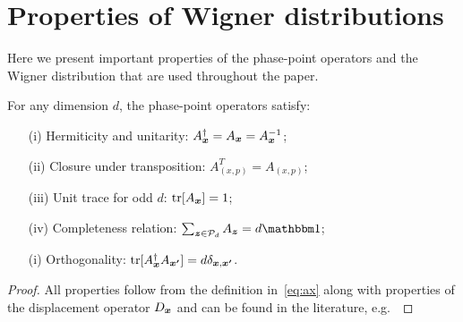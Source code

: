 \section{Properties of Wigner distributions}
\label{app:wigner}

Here we present important properties of the phase-point operators and the Wigner distribution that are used throughout the paper.

\begin{proposition}\label{thm:aproperties}
    For any dimension $d$, the phase-point operators satisfy:
    \begin{enumerate}
        \item[(i)]\label{en:a1} Hermiticity and unitarity: $A_{\bm{x}}^\dagger = A_{\bm{x}} = A_{\bm{x}}^{-1}$;
	    \item[(ii)]\label{en:a2} Closure under transposition: $A_{(x, p)}^T = A_{(x, p)}$;
	    \item[(iii)]\label{en:a3} Unit trace for odd $d$: $\mbox{tr}[A_{\bm{x}}] = 1$;
	    \item[(iv)]\label{en:a4} Completeness relation: $\sum_{\bmz \in \cal{P}_d} A_{\bmz} = d\id$;
	    \item[(i)]\label{en:a5} Orthogonality: $\mbox{tr}[A_{\bm{x}}^\dagger A_{\bm{x'}}] = d \delta_{\bm{x},\bm{x'}}$.
	\end{enumerate}
\end{proposition}
\begin{proof}
	All properties follow from the definition in~\cref{eq:ax} along with properties of the displacement operator $D_{\bm{x}}$ and can be found in the literature, e.g.~\cite{cit:veitch,Vourdas_2004,cit:gross3}
\end{proof}

